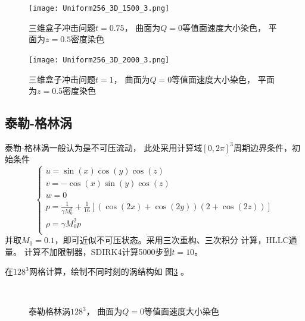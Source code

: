 \documentclass[UTF8,zihao=5]{ctexart} %
\begin{document}
\begin{figure}[htbp]
    \centering
    \texttt{[image: Uniform256\_3D\_1500\_3.png]}  %
    \caption{三维盒子冲击问题$t=0.75$，
        曲面为$Q=0$等值面速度大小染色，
        平面为$z=0.5$密度染色}
    \label{fig:Uniform256_3D_1500_3}
\end{figure}

\begin{figure}[htbp]
    \centering
    \texttt{[image: Uniform256\_3D\_2000\_3.png]}  %
    \caption{三维盒子冲击问题$t=1$，
        曲面为$Q=0$等值面速度大小染色，
        平面为$z=0.5$密度染色}
    \label{fig:Uniform256_3D_2000_3}
\end{figure}


\subsection{泰勒-格林涡}

泰勒-格林涡一般认为是不可压流动，
此处采用计算域$[0,2\pi]^3$周期边界条件，初始条件
$$
    \left\{
    \begin{array}{l}
        u = \sin(x) \cos(y) \cos(z)  \\
        v = -\cos(x) \sin(y) \cos(z) \\
        w = 0                        \\
        p = \frac{1}{\gamma M_0^2} + \frac{1}{16}\left[
            (\cos(2x) + \cos(2y)) (2 + \cos(2z))
        \right]                      \\
        \rho = \gamma M_0^2 p        \\
    \end{array}
    \right.
$$
并取$M_0=0.1$，即可近似不可压状态。采用三次重构、三次积分
计算，HLLC通量。
计算不加限制器，SDIRK4计算5000步到$t=10$。

在$128^3$网格计算，绘制不同时刻的涡结构如
图\ref{fig:Uniform128_3D_Periodic_TGV_5000}
。

\begin{figure}[htbp]
    \centering
    \\
    \caption{泰勒格林涡$128^3$，
        曲面为$Q=0$等值面速度大小染色}
    \label{fig:Uniform128_3D_Periodic_TGV_5000}
\end{figure}
\end{document}
